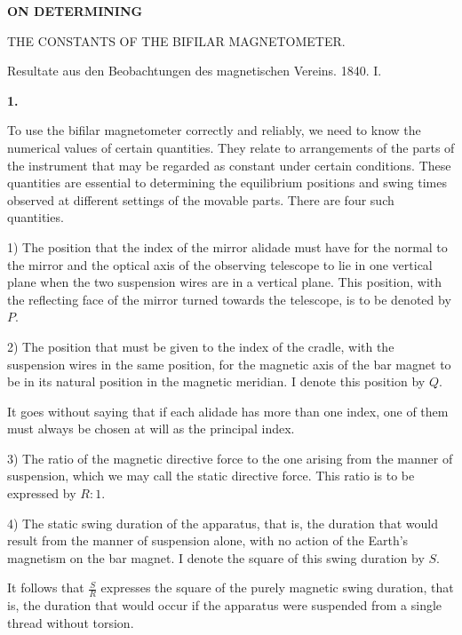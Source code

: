 \clearpage
{}
\begin{center}
{\Large\bfseries ON DETERMINING\par\medskip THE CONSTANTS OF THE BIFILAR MAGNETOMETER.}
\par\bigskip
Resultate aus den Beobachtungen des magnetischen Vereins. 1840. I.
\end{center}
\renewcommand{\Article}[1]{\par\medskip\Needspace{4\baselineskip}\pdfbookmark[1]{#1.}{bifilarconstanten-art-#1}\centerline{\textbf{#1.}}\nobreak\smallskip}%
\Article{1}
To use the bifilar magnetometer correctly and reliably, we need to know the numerical values of certain quantities. They relate to arrangements of the parts of the instrument that may be regarded as constant under certain conditions. These quantities are essential to determining the equilibrium positions and swing times observed at different settings of the movable parts. There are four such quantities.

1) The position that the index of the mirror alidade must have for the normal to the mirror and the optical axis of the observing telescope to lie in one vertical plane when the two suspension wires are in a vertical plane. This position, with the reflecting face of the mirror turned towards the telescope, is to be denoted by $P$.

2) The position that must be given to the index of the cradle, with the suspension wires in the same position, for the magnetic axis of the bar magnet to be in its natural position in the magnetic meridian. I denote this position by $Q$.

It goes without saying that if each alidade has more than one index, one of them must always be chosen at will as the principal index.

3) The ratio of the magnetic directive force to the one arising from the manner of suspension, which we may call the static directive force. This ratio is to be expressed by $R:1$.

4) The static swing duration of the apparatus, that is, the duration that would result from the manner of suspension alone, with no action of the Earth’s magnetism on the bar magnet. I denote the square of this swing duration by $S$.

It follows that $\frac{S}{R}$ expresses the square of the purely magnetic swing duration, that is, the duration that would occur if the apparatus were suspended from a single thread without torsion.

